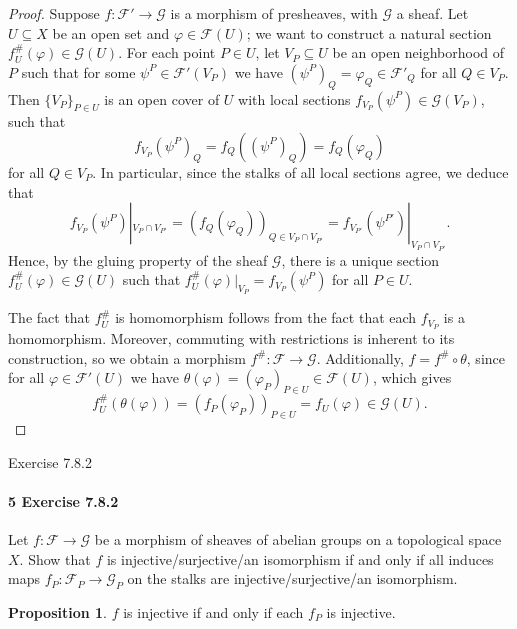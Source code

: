\documentclass[12pt]{article}
\newlength{\myparskip}
\newenvironment{fullbox}{\begin{lrbox}{\savefullbox}\begin{minipage}{\dimexpr\textwidth-2\fboxsep\relax}\setlength{\parskip}{\myparskip}}{\end{minipage}\end{lrbox}\framebox[\textwidth]{\usebox{\savefullbox}}}
\newenvironment{pbox}[1][]{\begin{fullbox}\ifx#1\empty\else\paragraph{#1}\phantom{}\fi}{\end{fullbox}}
\theoremstyle{definition}
\newtheorem{proposition}{Proposition}
\renewcommand{\phi}{\varphi}
\newcommand{\<}{\langle}
\renewcommand{\>}{\rangle}
\newcommand{\seq}{\subseteq}
\newcommand{\FF}{\mathcal{F}}
\newcommand{\GG}{\mathcal{G}}
\begin{document}
\begin{proof}
    Suppose $f : \FF' \to \GG$ is a morphism of presheaves, with $\GG$ a sheaf.
    Let $U \seq X$ be an open set and $\phi \in \FF(U)$; we want to construct a natural section $f^\#_U(\phi) \in \GG(U)$.
    For each point $P \in U$, let $V_P \seq U$ be an open neighborhood of $P$ such that for some $\psi^P \in \FF'(V_P)$ we have $(\psi^P)_Q = \phi_Q \in \FF'_Q$ for all $Q \in V_P$.
    Then $\{V_P\}_{P \in U}$ is an open cover of $U$ with local sections $f_{V_P}(\psi^P) \in \GG(V_P)$, such that
    \[
        f_{V_P}(\psi^P)_Q
            = f_Q((\psi^P)_Q)
            = f_Q(\phi_Q)
    \]
    for all $Q \in V_P$.
    In particular, since the stalks of all local sections agree, we deduce that
    \[
        f_{V_P}(\psi^P)|_{V_P \cap V_{P'}}
            = (f_Q(\phi_Q))_{Q \in V_P \cap V_{P'}}
            = f_{V_{P'}}(\psi^{P'})|_{V_P \cap V_{P'}}.
    \]
    Hence, by the gluing property of the sheaf $\GG$, there is a unique section $f^\#_U(\phi) \in \GG(U)$ such that $f^\#_U(\phi)|_{V_P} = f_{V_P}(\psi^P)$ for all $P \in U$.

    The fact that $f^\#_U$ is homomorphism follows from the fact that each $f_{V_P}$ is a homomorphism.
    Moreover, commuting with restrictions is inherent to its construction, so we obtain a morphism $f^\# : \FF \to \GG$.
    Additionally, $f = f^\# \circ \theta$, since for all $\phi \in \FF'(U)$ we have $\theta(\phi) = (\phi_P)_{P \in U} \in \FF(U)$, which gives
    \[
        f^\#_U(\theta(\phi))
            = (f_P(\phi_P))_{P \in U}
            = f_U(\phi)
            \in \GG(U).
    \]
\end{proof}






\newpage
\begin{pbox}[5 Exercise 7.8.2]
    Let $f : \FF \to \GG$ be a morphism of sheaves of abelian groups on a topological space $X$.
    Show that $f$ is injective/surjective/an isomorphism if and only if all induces maps $f_P : \FF_P \to \GG_P$ on the stalks are injective/surjective/an isomorphism.
\end{pbox}

\begin{proposition}
    $f$ is injective if and only if each $f_P$ is injective.
\end{proposition}
\end{document}
